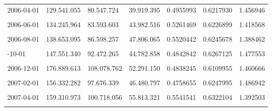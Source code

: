 \documentclass[12pt]{article}
\begin{document}
\begin{longtable}[t]{llllrrr}
2006-04-01 & 129.541.055 & 80.547.724 & 39.919.395 & 0.4955993 & 0.6217930 & 1.456946\\
\addlinespace
\cellcolor{gray!10}{2006-05-01} & \cellcolor{gray!10}{132.963.024} & \cellcolor{gray!10}{84.400.264} & \cellcolor{gray!10}{37.596.167} & \cellcolor{gray!10}{0.4454508} & \cellcolor{gray!10}{0.6347649} & \cellcolor{gray!10}{1.543230}\\
2006-06-01 & 134.245.964 & 83.593.603 & 43.982.516 & 0.5261469 & 0.6226899 & 1.418568\\
\cellcolor{gray!10}{2006-07-01} & \cellcolor{gray!10}{135.771.480} & \cellcolor{gray!10}{84.529.383} & \cellcolor{gray!10}{43.349.911} & \cellcolor{gray!10}{0.5128384} & \cellcolor{gray!10}{0.6225857} & \cellcolor{gray!10}{1.435338}\\
2006-08-01 & 138.653.095 & 86.598.257 & 47.806.065 & 0.5520442 & 0.6245678 & 1.388462\\
\cellcolor{gray!10}{2006-09-01} & \cellcolor{gray!10}{145.599.225} & \cellcolor{gray!10}{89.541.543} & \cellcolor{gray!10}{44.313.871} & \cellcolor{gray!10}{0.4948973} & \cellcolor{gray!10}{0.6149864} & \cellcolor{gray!10}{1.450602}\\
\addlinespace
2006-10-01 & 147.551.340 & 92.472.265 & 44.782.858 & 0.4842842 & 0.6267125 & 1.477553\\
\cellcolor{gray!10}{2006-11-01} & \cellcolor{gray!10}{154.440.846} & \cellcolor{gray!10}{96.945.902} & \cellcolor{gray!10}{47.840.064} & \cellcolor{gray!10}{0.4934718} & \cellcolor{gray!10}{0.6277219} & \cellcolor{gray!10}{1.466187}\\
2006-12-01 & 176.889.613 & 108.078.762 & 52.291.150 & 0.4838245 & 0.6109955 & 1.460666\\
\cellcolor{gray!10}{2007-01-01} & \cellcolor{gray!10}{158.186.929} & \cellcolor{gray!10}{98.241.034} & \cellcolor{gray!10}{49.749.701} & \cellcolor{gray!10}{0.5064045} & \cellcolor{gray!10}{0.6210439} & \cellcolor{gray!10}{1.442054}\\
2007-02-01 & 156.332.282 & 97.676.339 & 46.480.797 & 0.4758655 & 0.6247995 & 1.486942\\
\addlinespace
\cellcolor{gray!10}{2007-03-01} & \cellcolor{gray!10}{158.398.773} & \cellcolor{gray!10}{99.404.163} & \cellcolor{gray!10}{48.241.093} & \cellcolor{gray!10}{0.4853025} & \cellcolor{gray!10}{0.6275564} & \cellcolor{gray!10}{1.477109}\\
2007-04-01 & 159.310.973 & 100.718.056 & 55.813.321 & 0.5541541 & 0.6322104 & 1.392503\\
\cellcolor{gray!10}{2007-05-01} & \cellcolor{gray!10}{160.825.317} & \cellcolor{gray!10}{101.610.122} & \cellcolor{gray!10}{49.035.457} & \cellcolor{gray!10}{0.4825844} & \cellcolor{gray!10}{0.6318043} & \cellcolor{gray!10}{1.485675}\\

\end{longtable}
\end{document}
